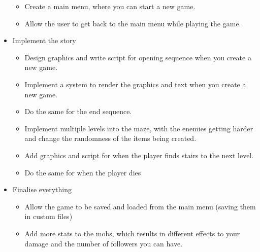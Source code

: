 \documentclass{article}
\begin{document}
\begin{itemize}
\begin{itemize}
                        \item Create a main menu, where you can start a new game.
                        \item Allow the user to get back to the main menu while playing the game.
                    \end{itemize}
                \item Implement the story
                    \begin{itemize}
                        \item Design graphics and write script for opening sequence when you create a new game.
                        \item Implement a system to render the graphics and text when you create a new game.
                        \item Do the same for the end sequence.
                        \item Implement multiple levels into the maze, with the enemies getting harder and change the randomness of the items being created.
                        \item Add graphics and script for when the player finds stairs to the next level.
                        \item Do the same for when the player dies
                    \end{itemize}
                \item Finalise everything
                    \begin{itemize}
                        \item Allow the game to be saved and loaded from the main menu (saving them in custom files)
                        \item Add more stats to the mobs, which results in different effects to your damage and the number of followers you can have.
                    \end{itemize}
            \end{itemize}
\end{document}
